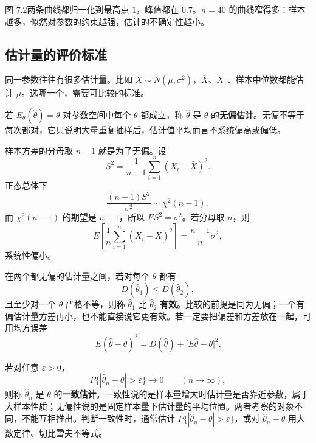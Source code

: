 {\small 图 7.2\quad 两条曲线都归一化到最高点 $1$，峰值都在 $0.7$。$n=40$ 的曲线窄得多：样本越多，似然对参数的约束越强，估计的不确定性越小。}

\subsection{估计量的评价标准}

同一参数往往有很多估计量。比如 $X\sim N(\mu,\sigma^2)$，$\bar X$、$X_1$、样本中位数都能估计 $\mu$。选哪一个，需要可比较的标准。

若 $E_\theta(\widehat\theta)=\theta$ 对参数空间中每个 $\theta$ 都成立，称 $\widehat\theta$ 是 $\theta$ 的\textbf{无偏估计}。无偏不等于每次都对，它只说明大量重复抽样后，估计值平均而言不系统偏高或偏低。

样本方差的分母取 $n-1$ 就是为了无偏。设
\[
S^2=\frac{1}{n-1}\sum_{i=1}^{n}(X_i-\bar X)^2.
\]
正态总体下
\[
\frac{(n-1)S^2}{\sigma^2}\sim\chi^2(n-1),
\]
而 $\chi^2(n-1)$ 的期望是 $n-1$，所以 $E S^2=\sigma^2$。若分母取 $n$，则
\[
E\left[\frac1n\sum_{i=1}^{n}(X_i-\bar X)^2\right]=\frac{n-1}{n}\sigma^2,
\]
系统性偏小。

在两个都无偏的估计量之间，若对每个 $\theta$ 都有
\[
D(\widehat\theta_1)\le D(\widehat\theta_2),
\]
且至少对一个 $\theta$ 严格不等，则称 $\widehat\theta_1$ 比 $\widehat\theta_2$ \textbf{有效}。比较的前提是同为无偏；一个有偏估计量方差再小，也不能直接说它更有效。若一定要把偏差和方差放在一起，可用均方误差
\[
E(\widehat\theta-\theta)^2=D(\widehat\theta)+\bigl[E\widehat\theta-\theta\bigr]^2.
\]

若对任意 $\varepsilon>0$，
\[
P\{|\widehat\theta_n-\theta|>\varepsilon\}\to 0\qquad(n\to\infty),
\]
则称 $\widehat\theta_n$ 是 $\theta$ 的\textbf{一致估计}。一致性说的是样本量增大时估计量是否靠近参数，属于大样本性质；无偏性说的是固定样本量下估计量的平均位置。两者考察的对象不同，不能互相推出。判断一致性时，通常估计 $P\{|\widehat\theta_n-\theta|>\varepsilon\}$，或对 $\widehat\theta_n-\theta$ 用大数定律、切比雪夫不等式。

\begin{center}
\end{center}

